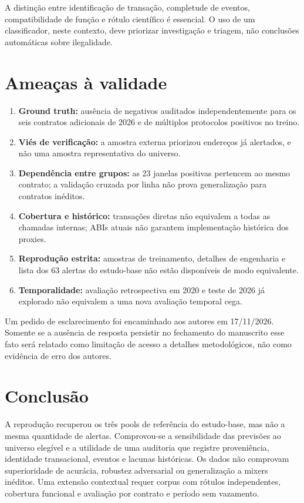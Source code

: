 \documentclass[11pt,a4paper]{article}
\begin{document}
A distinção entre identificação de transação, completude de eventos, compatibilidade de função e rótulo científico é essencial. O uso de um classificador, neste contexto, deve priorizar investigação e triagem, não conclusões automáticas sobre ilegalidade.

\section{Ameaças à validade}
\begin{enumerate}
\item \textbf{Ground truth:} ausência de negativos auditados independentemente para os seis contratos adicionais de 2026 e de múltiplos protocolos positivos no treino.
\item \textbf{Viés de verificação:} a amostra externa priorizou endereços já alertados, e não uma amostra representativa do universo.
\item \textbf{Dependência entre grupos:} as 23 janelas positivas pertencem ao mesmo contrato; a validação cruzada por linha não prova generalização para contratos inéditos.
\item \textbf{Cobertura e histórico:} transações diretas não equivalem a todas as chamadas internas; ABIs atuais não garantem implementação histórica dos proxies.
\item \textbf{Reprodução estrita:} amostras de treinamento, detalhes de engenharia e lista dos 63 alertas do estudo-base não estão disponíveis de modo equivalente.
\item \textbf{Temporalidade:} avaliação retrospectiva em 2020 e teste de 2026 já explorado não equivalem a uma nova avaliação temporal cega.
\end{enumerate}
Um pedido de esclarecimento foi encaminhado aos autores em 17/11/2026. Somente se a ausência de resposta persistir no fechamento do manuscrito esse fato será relatado como limitação de acesso a detalhes metodológicos, não como evidência de erro dos autores.

\section{Conclusão}
A reprodução recuperou os três pools de referência do estudo-base, mas não a mesma quantidade de alertas. Comprovou-se a sensibilidade das previsões ao universo elegível e a utilidade de uma auditoria que registre proveniência, identidade transacional, eventos e lacunas históricas. Os dados não comprovam superioridade de acurácia, robustez adversarial ou generalização a mixers inéditos. Uma extensão contextual requer corpus com rótulos independentes, cobertura funcional e avaliação por contrato e período sem vazamento.
\end{document}
